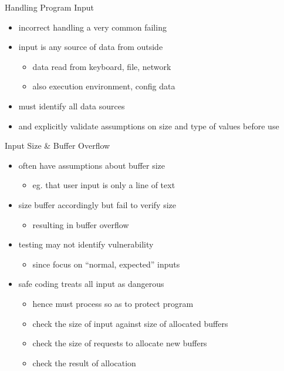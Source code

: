 \documentclass{beamer}
\begin{document}
\begin{frame}{Handling Program Input}
  \begin{itemize}
  \item incorrect handling a very common failing
  \item input is any source of data from outside
    \begin{itemize}
    \item data read from keyboard, file, network
    \item also execution environment, config data
    \end{itemize}
  \item must identify all data sources
  \item and explicitly validate assumptions on size and
type of values before use 
  \end{itemize}
\end{frame}

\begin{frame}{Input Size \& Buffer Overflow}
  \begin{itemize}
  \item often have assumptions about buffer size
    \begin{itemize}
    \item eg. that user input is only a line of text
    \end{itemize}
  \item size buffer accordingly but fail to verify size
    \begin{itemize}
    \item resulting in buffer overflow
    \end{itemize}
  \item testing may not identify vulnerability
    \begin{itemize}
    \item since focus on ``normal, expected'' inputs
    \end{itemize}
  \item safe coding treats all input as dangerous
    \begin{itemize}
    \item hence must process so as to protect program 
    \item check the size of input against size of allocated buffers
    \item check the size of requests to allocate new buffers
    \item check the result of allocation
    \end{itemize}
  \end{itemize}
\end{frame}
\end{document}
